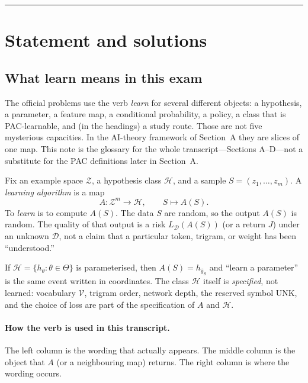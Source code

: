 \documentclass[11pt,a4paper]{article}
\theoremstyle{definition}
\begin{document}
\noindent\rule{\linewidth}{0.4pt}

\section{Statement and solutions}

\subsection{What learn means in this exam}\label{sec:spr2025-learn}

The official problems use the verb \emph{learn} for several different objects: a hypothesis, a parameter, a feature map, a conditional probability, a policy, a class that is PAC-learnable, and (in the headings) a study route. Those are not five mysterious capacities. In the AI-theory framework of Section~A they are slices of one map. This note is the glossary for the whole transcript---Sections A--D---not a substitute for the PAC definitions later in Section~A.

\begin{definition}\label{def:spr2025-learn}
Fix an example space \(\mathcal{Z}\), a hypothesis class \(\mathcal{H}\), and a sample \(S=(z_1,\ldots,z_m)\). A \emph{learning algorithm} is a map
\[
A:\mathcal{Z}^m\to\mathcal{H},\qquad S\mapsto A(S).
\]
To \emph{learn} is to compute \(A(S)\). The data \(S\) are random, so the output \(A(S)\) is random. The quality of that output is a risk \(L_{\mathcal{D}}(A(S))\) (or a return \(J\)) under an unknown \(\mathcal{D}\), not a claim that a particular token, trigram, or weight has been ``understood.''
\end{definition}

If \(\mathcal{H}=\{h_\theta:\theta\in\Theta\}\) is parameterised, then \(A(S)=h_{\widehat\theta_S}\) and ``learn a parameter'' is the same event written in coordinates. The class \(\mathcal{H}\) itself is \emph{specified}, not learned: vocabulary \(\mathcal{V}\), trigram order, network depth, the reserved symbol \(\mathrm{UNK}\), and the choice of loss are part of the specification of \(A\) and \(\mathcal{H}\).

\paragraph{How the verb is used in this transcript.}
The left column is the wording that actually appears. The middle column is the object that \(A\) (or a neighbouring map) returns. The right column is where the wording occurs.
\end{document}
